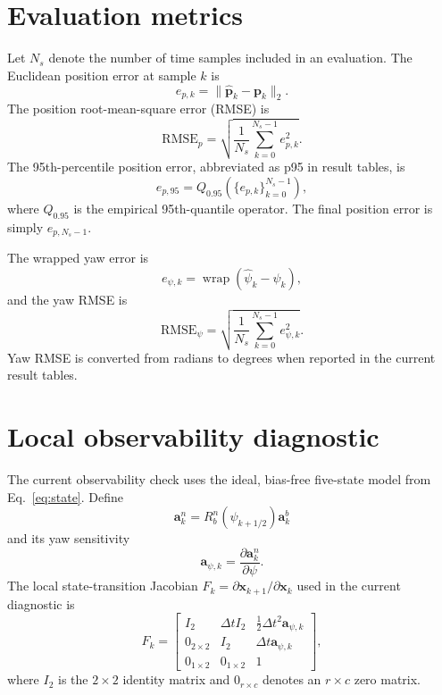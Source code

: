 \section{Evaluation metrics}
Let $N_s$ denote the number of time samples included in an evaluation. The Euclidean position error at sample $k$ is
\begin{equation}
e_{p,k}=\lVert\hat{\bm{p}}_k-\bm{p}_k\rVert_2.
\end{equation}
The position root-mean-square error (RMSE) is
\begin{equation}
\mathrm{RMSE}_p=
\sqrt{\frac{1}{N_s}\sum_{k=0}^{N_s-1}e_{p,k}^2}.
\end{equation}
The 95th-percentile position error, abbreviated as p95 in result tables, is
\begin{equation}
e_{p,95}=Q_{0.95}\!\left(\{e_{p,k}\}_{k=0}^{N_s-1}\right),
\end{equation}
where $Q_{0.95}$ is the empirical 95th-quantile operator. The final position error is simply $e_{p,N_s-1}$.

The wrapped yaw error is
\begin{equation}
e_{\psi,k}=\operatorname{wrap}(\hat\psi_k-\psi_k),
\end{equation}
and the yaw RMSE is
\begin{equation}
\mathrm{RMSE}_{\psi}=
\sqrt{\frac{1}{N_s}\sum_{k=0}^{N_s-1}e_{\psi,k}^2}.
\end{equation}
Yaw RMSE is converted from radians to degrees when reported in the current result tables.

\section{Local observability diagnostic}
The current observability check uses the ideal, bias-free five-state model from Eq.~\eqref{eq:state}. Define
\begin{equation}
\bm{a}_k^n=R_b^n(\psi_{k+1/2})\bm{a}_k^b
\end{equation}
and its yaw sensitivity
\begin{equation}
\bm{a}_{\psi,k}=\frac{\partial\bm{a}_k^n}{\partial\psi}.
\end{equation}
The local state-transition Jacobian $F_k=\partial\bm{x}_{k+1}/\partial\bm{x}_k$ used in the current diagnostic is
\begin{equation}
F_k=
\begin{bmatrix}
I_2 & \Delta t I_2 & \frac12\Delta t^2\bm{a}_{\psi,k}\\
0_{2\times2} & I_2 & \Delta t\bm{a}_{\psi,k}\\
0_{1\times2} & 0_{1\times2} & 1
\end{bmatrix},
\end{equation}
where $I_2$ is the $2\times2$ identity matrix and $0_{r\times c}$ denotes an $r\times c$ zero matrix.

